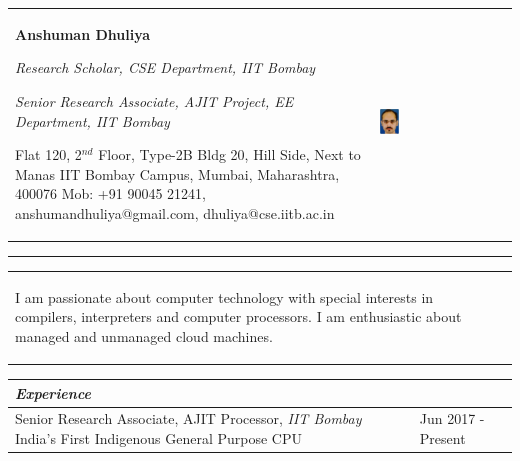 \documentclass[a4paper,12pt]{article}
\newcommand{\Heading}[1]{\textbf{\itshape\normalsize #1}}
\begin{document}
\begin{flushleft}



    \begin{tabular*}{\textwidth}{m{} m{} }
        {\LARGE{}\rule[3ex]{0ex}{0ex}\textbf{Anshuman Dhuliya}}\newline%
        {\rule[3ex]{0ex}{0ex}\large{}\itshape{}Research Scholar, CSE Department, IIT Bombay} \newline%
        {\rule[3ex]{0ex}{0ex}\large{}\itshape{}Senior Research Associate, AJIT Project, EE Department, IIT Bombay} \newline%
        \rule[3ex]{0ex}{0ex}{Flat 120, 2$^{\textit{nd}}$ Floor, Type-2B Bldg 20, Hill Side, Next to Manas\newline%
IIT Bombay Campus, Mumbai, Maharashtra, 400076\newline%
        Mob: +91 90045 21241, anshumandhuliya@gmail.com, dhuliya@cse.iitb.ac.in}

&  \includegraphics[natwidth=273,natheight=360,width=0.15\textwidth]{images/anshuman1.eps} \\
\end{tabular*}
\rule[1pt]{\textwidth}{2pt}
\begin{tabular*}{\textwidth}{m{} m{} }
{\itshape{}\rule[3ex]{0ex}{0ex}I am passionate about
computer technology with special interests in
compilers, interpreters and computer processors.
I am enthusiastic about managed and unmanaged cloud machines.

} & \\
\end{tabular*}

    \vspace{3mm}
\begin{tabular}{ m{}| R{0.25\textwidth}}
\multicolumn{2}{l}{\Heading{Experience}} \\
    \hline
    \hline
    \rule[3ex]{0ex}{0ex}Senior Research Associate, AJIT Processor, \textit{IIT Bombay} \newline{}India's First Indigenous General Purpose CPU & Jun 2017 - Present\\ \hline


\end{tabular}
\end{flushleft}
\end{document}
